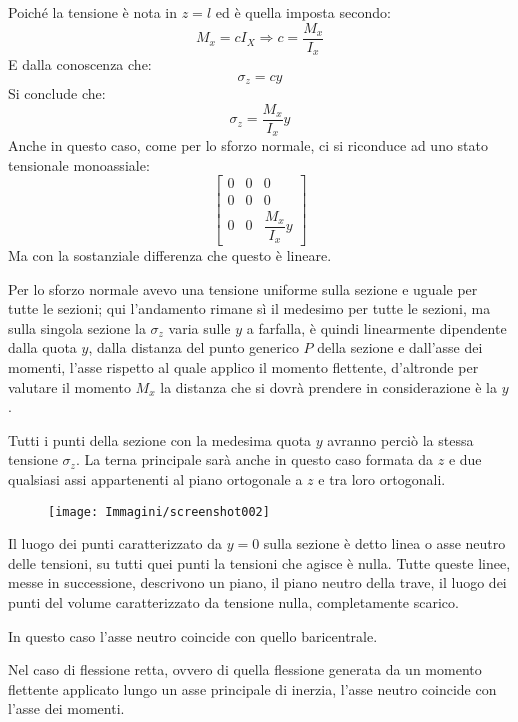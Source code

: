 \documentclass{article}
\begin{document}
\begin{adjustwidth}{2in}{}
		Poiché la tensione è nota in $z = l$ ed è quella imposta secondo:
		\[M_x = cI_X \Rightarrow c = \dfrac{M_x}{I_x} \]
		E dalla conoscenza che:
		\[ \sigma_z = cy\]
		Si conclude che: 
		\[ \sigma_z = \dfrac{M_x}{I_x}y \]
		Anche in questo caso, come per lo sforzo normale, ci si riconduce ad uno stato tensionale monoassiale: 
		\[ \left[\begin{array}{ccc}
			0 & 0 & 0 \\
			0 & 0 & 0 \\
			0 & 0 & \dfrac{M_x}{I_x}y
		\end{array}\right]\]
		Ma con la sostanziale differenza che questo è lineare.
		
		Per lo sforzo normale avevo una tensione uniforme sulla sezione e uguale per tutte le sezioni; qui l'andamento rimane sì il medesimo per tutte le sezioni, ma sulla singola sezione la $\sigma_z$ varia sulle $y$ a farfalla, è quindi linearmente dipendente dalla quota $y$, dalla distanza del punto generico $P$ della sezione e dall'asse dei momenti, l'asse rispetto al quale applico il momento flettente, d'altronde per valutare il momento $M_x$ la distanza che si dovrà prendere in considerazione è la $y$. 
		
		Tutti i punti della sezione con la medesima quota $ y $ avranno perciò la stessa tensione $\sigma_z$. 
\newpage		
		La terna principale sarà anche in questo caso formata da $ z $ e due qualsiasi assi
		appartenenti al piano ortogonale a $ z $ e tra loro ortogonali.
		
\begin{figure}[H]
	\centering
	\texttt{[image: Immagini/screenshot002]}
	\label{fig:screenshot002}
\end{figure}

		Il luogo dei punti caratterizzato da $y=0$ sulla sezione è detto linea o asse neutro delle tensioni, su tutti quei punti la tensioni che agisce è nulla. Tutte queste linee, messe in successione, descrivono un piano, il piano neutro della trave, il luogo dei punti del volume caratterizzato da tensione nulla, completamente scarico. 
		
		In questo caso l'asse neutro coincide con quello baricentrale. \newline
		
		Nel caso di flessione retta, ovvero di quella flessione generata da un momento flettente applicato lungo un asse principale di inerzia, l'asse neutro coincide con l'asse dei momenti. \newline 
		

\end{adjustwidth}
\end{document}
